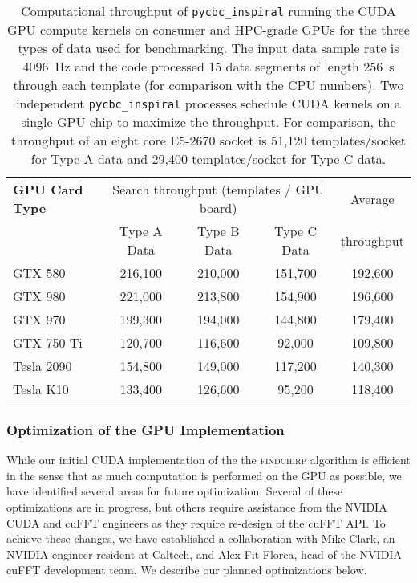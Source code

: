 \begin{table}[!t]
\centering
{\small
\begin{tabular}{|l|c|c|c|c|}
\hline 
{\bf GPU Card Type}  & \multicolumn{3}{c|}{Search throughput (templates / GPU board)} & Average \\
                     & Type A Data & Type B Data & Type C Data & throughput \\\hline
GTX 580 & 216,100 & 210,000 & 151,700 & 192,600 \\
GTX 980 & 221,000 & 213,800 & 154,900 & 196,600 \\
GTX 970 & 199,300 & 194,000 & 144,800 & 179,400 \\
GTX 750 Ti & 120,700 & 116,600 & 92,000 & 109,800 \\
Tesla 2090 & 154,800 & 149,000 & 117,200 & 140,300 \\
Tesla K10 & 133,400 & 126,600 & 95,200 & 118,400 \\\hline
\end{tabular}
}
\caption{\label{tab:gpu-results}
Computational throughput of \texttt{pycbc\_inspiral} running the CUDA GPU
compute kernels on consumer and HPC-grade GPUs for the three types of data
used for benchmarking. The input data sample rate is 4096~Hz and the code
processed 15 data segments of length 256~s through each template (for
comparison with the CPU numbers). Two independent \texttt{pycbc\_inspiral}
processes schedule CUDA kernels on a single GPU chip to maximize the
throughput.  For comparison, the throughput of an eight core E5-2670 socket is
51,120 templates/socket for Type A data and 29,400 templates/socket for Type C
data.
}
\end{table}

\vspace*{-10pt}
\subsubsection{Optimization of the GPU Implementation}
\vspace*{-05pt}

While our initial CUDA implementation of the the \textsc{findchirp} algorithm
is efficient in the sense that as much computation is performed on the GPU as
possible, we have identified several areas for future optimization. Several of
these optimizations are in progress, but others require assistance from the
NVIDIA CUDA and cuFFT engineers as they require re-design of the cuFFT API. To
achieve these changes, we 
have established a collaboration with Mike Clark, an NVIDIA engineer resident
at Caltech, and Alex Fit-Florea, head of the NVIDIA cuFFT development team. We
describe our planned optimizations below.

